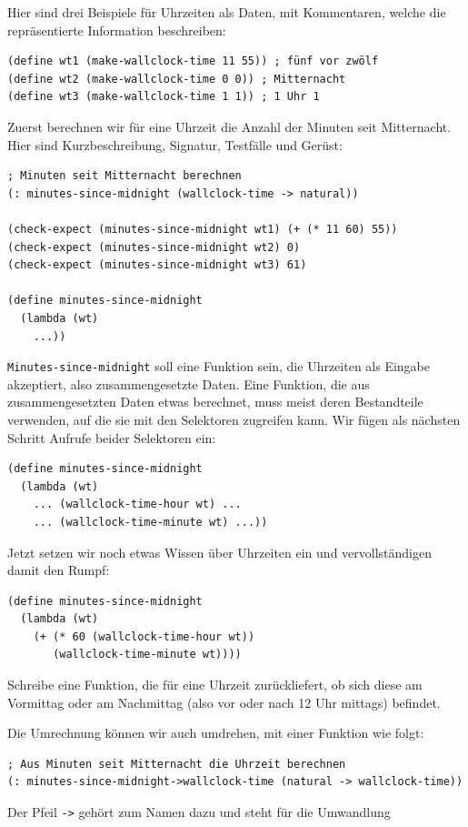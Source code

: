Hier sind drei Beispiele für Uhrzeiten als Daten, mit Kommentaren,
welche die repräsentierte Information beschreiben:
%
\begin{verbatim}
(define wt1 (make-wallclock-time 11 55)) ; fünf vor zwölf
(define wt2 (make-wallclock-time 0 0)) ; Mitternacht
(define wt3 (make-wallclock-time 1 1)) ; 1 Uhr 1
\end{verbatim}
%
Zuerst berechnen wir für eine Uhrzeit die Anzahl der Minuten
seit Mitternacht.  Hier sind Kurzbeschreibung, Signatur, Testfälle und Gerüst:
%
\begin{verbatim}
; Minuten seit Mitternacht berechnen
(: minutes-since-midnight (wallclock-time -> natural))

(check-expect (minutes-since-midnight wt1) (+ (* 11 60) 55))
(check-expect (minutes-since-midnight wt2) 0)
(check-expect (minutes-since-midnight wt3) 61)

(define minutes-since-midnight
  (lambda (wt)
    ...))
\end{verbatim}
%
\texttt{Minutes-since-midnight} soll eine Funktion sein, die
Uhrzeiten als Eingabe akzeptiert, also zusammengesetzte Daten.  Eine
Funktion, die aus zusammengesetzten Daten etwas berechnet, muss meist
deren Bestandteile verwenden, auf die sie mit den Selektoren zugreifen
kann.  Wir fügen als nächsten Schritt Aufrufe beider Selektoren ein:
%
\begin{verbatim}
(define minutes-since-midnight
  (lambda (wt)
    ... (wallclock-time-hour wt) ...
    ... (wallclock-time-minute wt) ...))
\end{verbatim}
%
Jetzt setzen wir noch etwas Wissen über Uhrzeiten ein und
vervollständigen damit den Rumpf:
%
\begin{verbatim}
(define minutes-since-midnight
  (lambda (wt)
    (+ (* 60 (wallclock-time-hour wt))
       (wallclock-time-minute wt))))
\end{verbatim}
%
\begin{aufgabe}
  Schreibe eine Funktion, die für eine Uhrzeit zurückliefert, ob sich
  diese am Vormittag oder am Nachmittag (also vor oder nach 12 Uhr
  mittags) befindet.
\end{aufgabe}
%
Die Umrechnung können wir auch umdrehen, mit einer Funktion wie folgt:
%
\begin{verbatim}
; Aus Minuten seit Mitternacht die Uhrzeit berechnen
(: minutes-since-midnight->wallclock-time (natural -> wallclock-time))
\end{verbatim}
%
Der Pfeil \verb|->| gehört zum Namen dazu und steht für die Umwandlung
